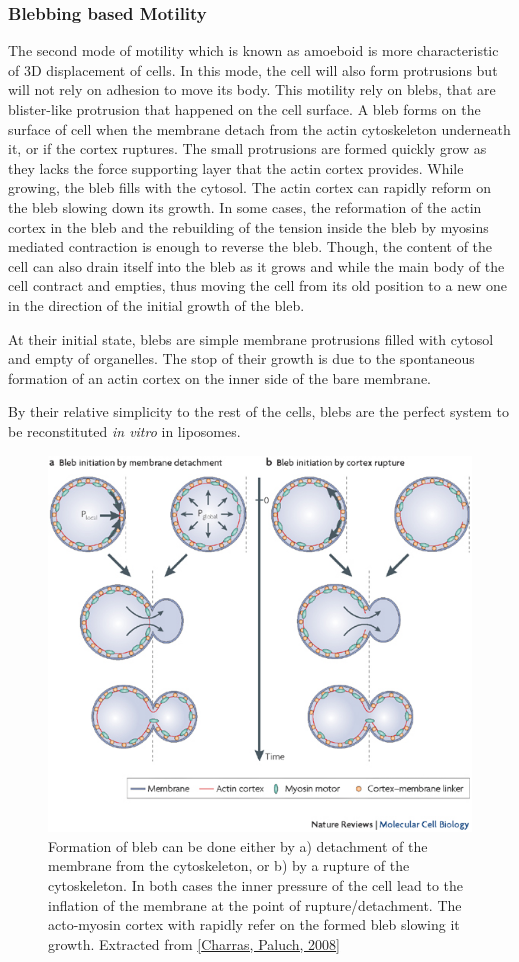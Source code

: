 \documentclass[A4paperpaper,11pt,english]{sphinxmanual}
\begin{document}
\subsubsection{Blebbing based Motility}
\label{parts/part1:blebbing-based-motility}
The second mode of motility which is known as amoeboid is more characteristic
of 3D displacement of cells. In this mode, the cell will also form protrusions
but will not rely on adhesion to move its body. This motility rely on blebs,
that are blister-like protrusion that happened on the cell surface. A bleb
forms on the surface of cell when the membrane detach from the actin
cytoskeleton underneath it, or if the cortex ruptures. The small protrusions
are formed quickly grow as they lacks the force supporting layer that the actin
cortex provides. While growing, the bleb fills with the cytosol. The actin
cortex can rapidly reform on the bleb slowing down its growth. In some cases,
the reformation of the actin cortex in the bleb and the rebuilding of the
tension inside the bleb by myosins mediated contraction is enough to reverse
the bleb. Though, the content of the cell can also drain itself into the bleb
as it grows and while the main body of the cell contract and empties, thus
moving the cell from its old position to a new one in the direction of the
initial growth of the bleb.

At their initial state, blebs are simple membrane protrusions filled with
cytosol and empty of organelles. The stop of their growth is due to the
spontaneous formation of an actin cortex on the inner side of the bare
membrane.

By their relative simplicity to the rest of the cells, blebs are the perfect
system to be reconstituted \emph{in vitro} in liposomes.
\begin{figure}[htbp]
\centering
\capstart

\includegraphics[width=0.700\linewidth]{Bleb-nature-paluch.jpg}
\caption{Formation of bleb can be done either by a) detachment of the membrane from
the cytoskeleton, or b) by a rupture of the cytoskeleton. In both cases the
inner pressure of the cell lead to the inflation of the membrane at the
point of rupture/detachment. The acto-myosin cortex with rapidly refer on
the formed bleb slowing it growth.
Extracted from {\hyperref[parts/part1:charras2008]{{[}Charras, Paluch,  2008{]}}}}\end{figure}
\end{document}
